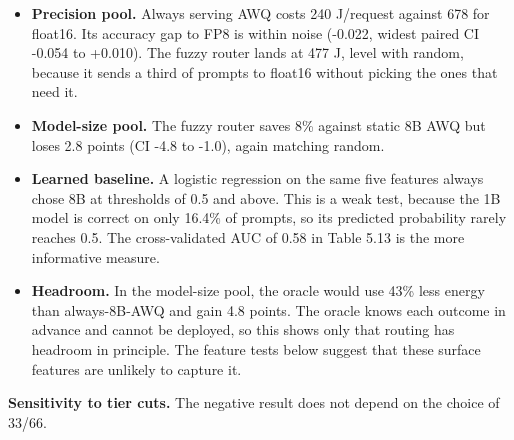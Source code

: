 \begin{itemize}
\item \textbf{Precision pool.} Always serving AWQ costs 240 J/request against 678 for float16. Its accuracy gap to FP8 is within noise (-0.022, widest paired CI -0.054 to +0.010). The fuzzy router lands at 477 J, level with random, because it sends a third of prompts to float16 without picking the ones that need it.
\item \textbf{Model-size pool.} The fuzzy router saves 8\% against static 8B AWQ but loses 2.8 points (CI -4.8 to -1.0), again matching random.
\item \textbf{Learned baseline.} A logistic regression on the same five features always chose 8B at thresholds of 0.5 and above. This is a weak test, because the 1B model is correct on only 16.4\% of prompts, so its predicted probability rarely reaches 0.5. The cross-validated AUC of 0.58 in Table 5.13 is the more informative measure.
\item \textbf{Headroom.} In the model-size pool, the oracle would use 43\% less energy than always-8B-AWQ and gain 4.8 points. The oracle knows each outcome in advance and cannot be deployed, so this shows only that routing has headroom in principle. The feature tests below suggest that these surface features are unlikely to capture it.
\end{itemize}
\textbf{Sensitivity to tier cuts.} The negative result does not depend on the choice of 33/66.



